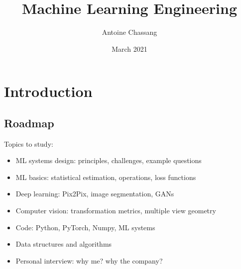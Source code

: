 \documentclass{report}
\title{Machine Learning Engineering}
\author{Antoine Chassang}
\date{March 2021}
\begin{document}
\maketitle
\tableofcontents

\chapter{Introduction}
\section{Roadmap}
Topics to study:
\begin{itemize}
    \item ML systems design: principles, challenges, example questions
    \item ML basics: statistical estimation, operations, loss functions
    \item Deep learning: Pix2Pix, image segmentation, GANs
    \item Computer vision: transformation metrics, multiple view geometry
    \item Code: Python, PyTorch, Numpy, ML systems
    \item Data structures and algorithms
    \item Personal interview: why me? why the company?
\end{itemize}








\end{document}
